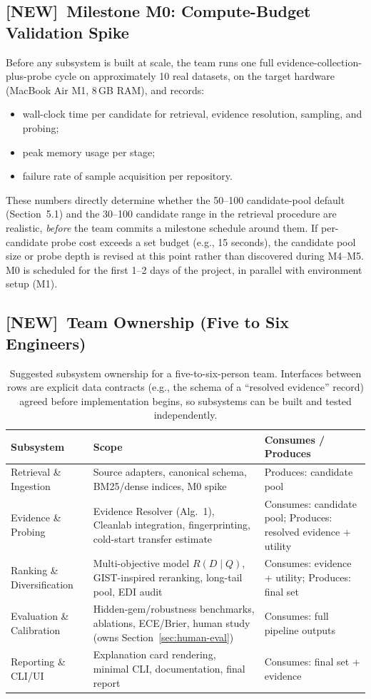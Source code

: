 \documentclass[11pt]{article}
\newcommand{\newtag}{\textcolor{accent}{\textbf{[NEW]}}\ }
\begin{document}
\subsection{\newtag Milestone M0: Compute-Budget Validation Spike}
\label{sec:m0}
Before any subsystem is built at scale, the team runs one full evidence-collection-plus-probe cycle on
approximately 10 real datasets, on the target hardware (MacBook Air M1, 8\,GB RAM), and records:
\begin{itemize}[leftmargin=*]
\item wall-clock time per candidate for retrieval, evidence resolution, sampling, and probing;
\item peak memory usage per stage;
\item failure rate of sample acquisition per repository.
\end{itemize}
These numbers directly determine whether the 50--100 candidate-pool default (Section~5.1) and the
30--100 candidate range in the retrieval procedure are realistic, \emph{before} the team commits a
milestone schedule around them. If per-candidate probe cost exceeds a set budget (e.g., 15 seconds),
the candidate pool size or probe depth is revised at this point rather than discovered during M4--M5.
M0 is scheduled for the first 1--2 days of the project, in parallel with environment setup (M1).

\subsection{\newtag Team Ownership (Five to Six Engineers)}
\label{sec:raci}
\begin{table}[h]
\centering
\small
\begin{tabular}{@{}p{3.4cm}p{6.8cm}p{2.6cm}@{}}
\toprule
\textbf{Subsystem} & \textbf{Scope} & \textbf{Consumes / Produces} \\
\midrule
Retrieval \& Ingestion & Source adapters, canonical schema, BM25/dense indices, M0 spike &
  Produces: candidate pool \\
Evidence \& Probing & Evidence Resolver (Alg.~1), Cleanlab integration, fingerprinting,
  cold-start transfer estimate & Consumes: candidate pool; Produces: resolved evidence + utility \\
Ranking \& Diversification & Multi-objective model $R(D\mid Q)$, GIST-inspired reranking,
  long-tail pool, EDI audit & Consumes: evidence + utility; Produces: final set \\
Evaluation \& Calibration & Hidden-gem/robustness benchmarks, ablations, ECE/Brier, human study
  (owns Section~\ref{sec:human-eval}) & Consumes: full pipeline outputs \\
Reporting \& CLI/UI & Explanation card rendering, minimal CLI, documentation, final report &
  Consumes: final set + evidence \\
\bottomrule
\end{tabular}
\caption{Suggested subsystem ownership for a five-to-six-person team. Interfaces between rows are explicit
data contracts (e.g., the schema of a ``resolved evidence'' record) agreed before implementation begins,
so subsystems can be built and tested independently.}
\end{table}
\end{document}
